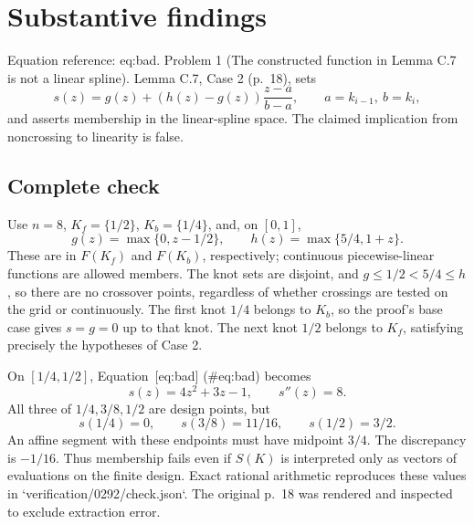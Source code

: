 \documentclass[10pt]{article}
\begin{document}
\section*{Substantive findings}
Equation reference: eq:bad. Problem 1 (The constructed function in Lemma C.7 is not a linear spline).  Lemma C.7, Case 2 (p. 18), sets \[
 s(z)=g(z)+(h(z)-g(z))\frac{z-a}{b-a},
 \qquad a=k_{i-1},\ b=k_i,\] and asserts membership in the linear-spline space. The claimed implication from noncrossing to linearity is false.\par
\subsection*{Complete check}
Use \(n=8\), \(K_f=\{1/2\}\), \(K_b=\{1/4\}\), and, on \([0,1]\), \[g(z)=\max\{0,z-1/2\},\qquad h(z)=\max\{5/4,1+z\}.\] These are in \(F(K_f)\) and \(F(K_b)\), respectively; continuous piecewise-linear functions are allowed members. The knot sets are disjoint, and \(g\le1/2<5/4\le h\), so there are no crossover points, regardless of whether crossings are tested on the grid or continuously. The first knot \(1/4\) belongs to \(K_b\), so the proof’s base case gives \(s=g=0\) up to that knot. The next knot \(1/2\) belongs to \(K_f\), satisfying precisely the hypotheses of Case 2.\par
On \([1/4,1/2]\), Equation [eq:bad] (\#eq:bad) becomes \[s(z)=4z^2+3z-1,\qquad s''(z)=8.\] All three of \(1/4,3/8,1/2\) are design points, but \[s(1/4)=0,\qquad s(3/8)=11/16,\qquad s(1/2)=3/2.\] An affine segment with these endpoints must have midpoint \(3/4\). The discrepancy is \(-1/16\). Thus membership fails even if \(S(K)\) is interpreted only as vectors of evaluations on the finite design. Exact rational arithmetic reproduces these values in `verification/0292/check.json`. The original p. 18 was rendered and inspected to exclude extraction error.\par
\end{document}
